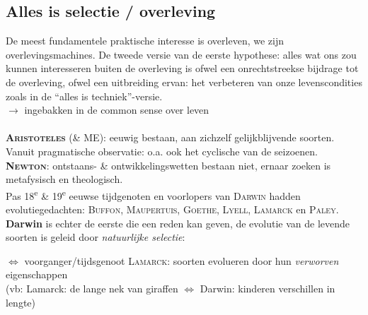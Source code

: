 \documentclass[11pt,a4paper]{article}
\begin{document}
\subsection{Alles is selectie / overleving}
De meest fundamentele praktische interesse is overleven, we zijn overlevingsmachines. De tweede versie van de eerste hypothese: alles wat ons zou kunnen interesseren buiten de overleving is ofwel een onrechtstreekse bijdrage tot de overleving, ofwel een uitbreiding ervan: het verbeteren van onze levenscondities zoals in de ``alles is techniek''-versie.
\\
$\rightarrow$ ingebakken in de common sense over leven
\\
\\
\textsc{\textbf{Aristoteles}} (\& ME): eeuwig bestaan, aan zichzelf gelijkblijvende soorten.
\\ Vanuit pragmatische observatie: o.a. ook het cyclische van de seizoenen.
\\
\textbf{\textsc{Newton}}: ontstaans- \& ontwikkelingswetten bestaan niet, ernaar zoeken is metafysisch en theologisch.
\\ Pas 18\textsuperscript{e} \& 19\textsuperscript{e} eeuwse tijdgenoten en voorlopers van \textsc{Darwin} hadden evolutiegedachten: \textsc{Buffon}, \textsc{Maupertuis}, \textsc{Goethe}, \textsc{Lyell}, \textsc{Lamarck} en \textsc{Paley}.
\\ \textbf{Darwin} is echter de eerste die een reden kan geven, de evolutie van de levende soorten is geleid door \emph{natuurlijke selectie}:
\\
\begin{center}
\end{center}
$\Leftrightarrow$ voorganger/tijdsgenoot \textsc{Lamarck}: soorten evolueren door hun \emph{verworven} eigenschappen \\ \indent(vb: Lamarck: de lange nek van giraffen $\Leftrightarrow$ Darwin: kinderen verschillen in lengte)
\end{document}
